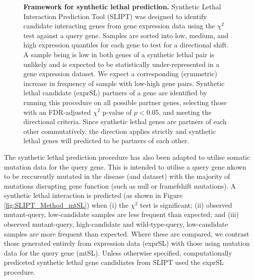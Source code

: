 \begin{figure}[!ht]
  \begin{center}
  \resizebox{0.8 \textwidth}{!}{
    
   }
   \end{center}
   \caption[Framework for synthetic lethal prediction]{\textbf{Framework for synthetic lethal prediction.} Synthetic Lethal Interaction Prediction Tool (SLIPT) was designed to identify candidate interacting genes from gene expression data using the $\chi^2$ test against a query gene. Samples are sorted into low, medium, and high expression quantiles for each gene to test for a directional shift. A sample being is low in both genes of a synthetic lethal pair is unlikely and is expected to be statistically under-represented in a gene expression dataset. We expect a corresponding (symmetric) increase in frequency of sample with low-high gene pairs. Synthetic lethal candidate (exprSL) partners of a gene are identified by running this procedure on all possible partner genes, selecting those with an FDR-adjusted $\chi^2$ p-value of $p < 0.05$, and meeting the directional criteria. Since synthetic lethal genes are partners of each other commutatively, the direction applies strictly and synthetic lethal genes will predicted to be partners of each other.
}
\label{fig:SLIPT_Method}
\end{figure}

The synthetic lethal prediction procedure has also been adapted to utilise somatic mutation data for the query gene. This is intended to utilise a query gene nkown to be reccurently mutated in the disease (and dataset) with the majority of mutations disrupting gene function (such as null or framefshift mutations). A synthetic lethal interaction is predicted  (as shown in Figure \ref{fig:SLIPT_Method_mtSL}) when (i) the $\chi^2$ test is significant; (ii) observed mutant-query, low-candidate samples are less frequent than expected; and (iii) observed mutant-query, high-candidate and wild-type-query, low-candidate samples are more frequent than expected. Where these are compared, we contrast those generated entirely from expression data (exprSL) with those using mutation data for the query gene (mtSL). Unless otherwise specified, computationally prediceted synthetic lethal gene candidiates from SLIPT used the exprSL procedure.

